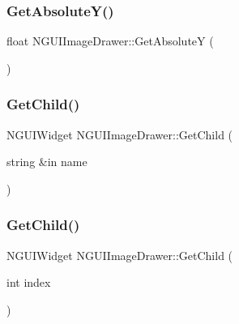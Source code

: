 \hypertarget{class_n_g_u_i_image_drawer_a008fbfcc826ebf1733ac5eef332c9afb}{}\label{class_n_g_u_i_image_drawer_a008fbfcc826ebf1733ac5eef332c9afb} 
\subsubsection{\texorpdfstring{Get\+Absolute\+Y()}{GetAbsoluteY()}}
{\footnotesize\ttfamily float N\+G\+U\+I\+Image\+Drawer\+::\+Get\+AbsoluteY (\begin{DoxyParamCaption}{ }\end{DoxyParamCaption})}

\hypertarget{class_n_g_u_i_image_drawer_ae386b95d4257d66a5f8e7eba512a7579}{}\label{class_n_g_u_i_image_drawer_ae386b95d4257d66a5f8e7eba512a7579} 
\subsubsection{\texorpdfstring{Get\+Child()}{GetChild()}\hspace{0.1cm}{\footnotesize\ttfamily [1/2]}}
{\footnotesize\ttfamily N\+G\+U\+I\+Widget N\+G\+U\+I\+Image\+Drawer\+::\+Get\+Child (\begin{DoxyParamCaption}\item[{string \&in}]{name }\end{DoxyParamCaption})}

\hypertarget{class_n_g_u_i_image_drawer_a84e5123524010398419749efa275585f}{}\label{class_n_g_u_i_image_drawer_a84e5123524010398419749efa275585f} 
\subsubsection{\texorpdfstring{Get\+Child()}{GetChild()}\hspace{0.1cm}{\footnotesize\ttfamily [2/2]}}
{\footnotesize\ttfamily N\+G\+U\+I\+Widget N\+G\+U\+I\+Image\+Drawer\+::\+Get\+Child (\begin{DoxyParamCaption}\item[{int}]{index }\end{DoxyParamCaption})}


